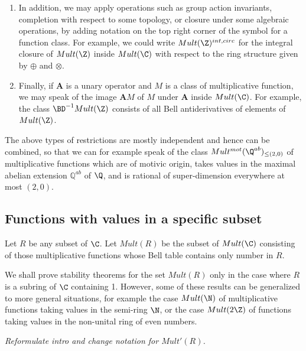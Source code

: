 \begin{enumerate}
\item In addition, we may apply operations such as group action invariants, completion with respect to some topology, or closure under some algebraic operations, by adding notation on the top right corner of the symbol for a function class. For example, we could write $Mult(\Z)^{int,circ}$ for the integral closure of $Mult(\Z)$ inside $Mult(\C)$ with respect to the ring structure given by $\oplus$ and $\otimes$.

\item Finally, if $\mathbf{A}$ is a unary operator and $M$ is a class of multiplicative function, we may speak of the image $\mathbf{A} M$ of $M$ under $\mathbf{A}$ inside $Mult(\C)$. For example, the class $\BD^{-1} Mult(\Z)$ consists of all Bell antiderivatives of elements of $Mult(\Z)$.  

\end{enumerate}

The above types of restrictions are mostly independent and hence can be combined, so that we can for example speak of the class $Mult^{mot}(\Q^{ab})_{\leq(2, 0)}$ of multiplicative functions which are of motivic origin, takes values in the maximal abelian extension $\mathbb{Q}^{ab}$ of $\Q$, and is rational of super-dimension everywhere at most $(2, 0)$.



\subsection{Functions with values in a specific subset}

\begin{definition}
Let $R$ be any subset of $\C$. Let $Mult(R)$ be the subset of $Mult(\C)$ consisting of those multiplicative functions whose Bell table contains only number in $R$.
\end{definition}

\begin{remark}
We shall prove stability theorems for the set $Mult(R)$ only in the case where $R$ is a subring of $\C$ containing 1. However, some of these results can be generalized to more general situations, for example the case $Mult(\N)$ of multiplicative functions taking values in the semi-ring $\N$, or the case $Mult(2 \Z)$ of functions taking values in the non-unital ring of even numbers.
\end{remark}

\emph{Reformulate intro and change notation for $Mult'(R)$.}

